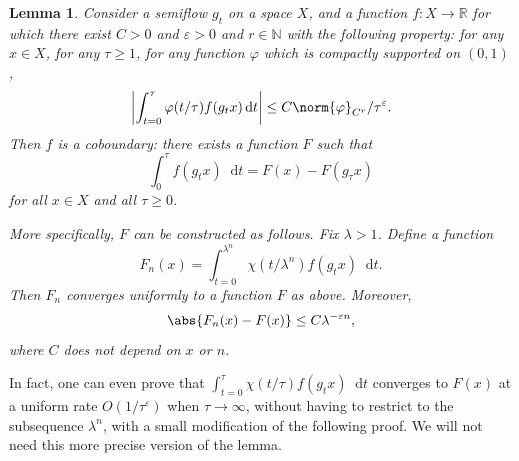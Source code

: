\documentclass[JEP,XML,SOM,Unicode]{cedram}
\newcommand{\N}{\mathbb{N}}
\newcommand{\R}{\mathbb{R}}
\newcommand{\dd}{\mathop{}\!\mathrm{d}}
\newcommand{\absgg}[1]{\biggl \lvert#1\biggr\rvert}
\let\epsilon\varepsilon
\let\phi\varphi
\newtheorem{lem}[thm]{Lemma}
\theoremstyle{definition}
\numberwithin{equation}{section}
\begin{document}
\begin{lem}
\label{lem:GL_coboundary} Consider a semiflow $g_t$ on a space $X$, and a
function $f:X \to \R$ for which there exist $C>0$ and $\epsilon>0$ and $r\in
\N$ with the following property: for any $x \in X$, for any $\tau\geq 1$, for
any function $\phi$ which is compactly supported on $(0,1)$,
\begin{equation}
\label{eq:ziuerpoiuprt}
\absgg{\int_{t=0}^\tau \phi(t/\tau) f(g_t x) \dd t} \leq C\norm{\phi}_{C^r}/\tau^\epsilon.
\end{equation}
Then $f$ is a coboundary: there exists a function $F$ such that\[
\int_0^\tau
f(g_t x) \dd t = F(x) - F(g_\tau x)
\]
for all $x\in X$ and all $\tau \geq 0$.

More specifically, $F$ can be constructed as follows. Fix $\lambda > 1$.
Define a function
\[
F_n(x) = \int_{t=0}^{\lambda^n} \chi(t/\lambda^n) f(g_t x)
\dd t.
\]
Then $F_n$ converges uniformly to a function $F$ as above. Moreover,
\[
\abs{F_n(x)-F(x)} \leq C \lambda^{-\epsilon n},
\]
where $C$ does not depend on
$x$ or $n$.
\end{lem}
In fact, one can even prove that $\int_{t=0}^{\tau} \chi(t/\tau) f(g_t x) \dd
t$ converges to $F(x)$ at a uniform rate $O(1/\tau^\epsilon)$ when $\tau\to
\infty$, without having to restrict to the subsequence $\lambda^n$, with a
small modification of the following proof. We will not need this more precise
version of the lemma.
\end{document}
